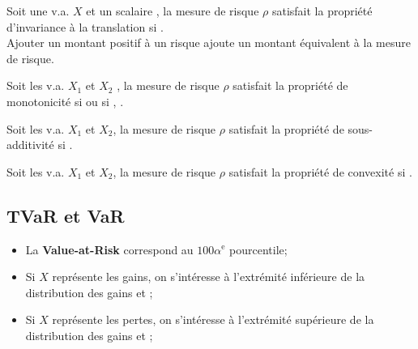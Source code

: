 \documentclass[10pt, french]{article}
\begin{document}
\begin{multicols*}{2}
\begin{definitionNOHFILLsub}
Soit une v.a. $X$ et un scalaire , la mesure de risque $\rho$ satisfait la propriété d'invariance à la translation si .	\\

Ajouter un montant positif à un risque ajoute un montant équivalent à la mesure de risque.
\end{definitionNOHFILLsub}

\begin{definitionNOHFILLsub}[Monotonicité]
Soit les v.a. $X_{1}$ et $X_{2}$ , la mesure de risque $\rho$ satisfait la propriété de monotonicité si  ou si , .

\end{definitionNOHFILLsub}

\begin{definitionNOHFILLsub}
Soit les v.a. $X_{1}$ et $X_{2}$, la mesure de risque $\rho$ satisfait la propriété de sous-additivité si .

\end{definitionNOHFILLsub}

\begin{definitionNOHFILLsub}[Convexité]
Soit les v.a. $X_{1}$ et $X_{2}$, la mesure de risque $\rho$ satisfait la propriété de convexité si .

\end{definitionNOHFILLsub}

\subsection{TVaR et VaR}

\begin{itemize}
	\item	La \textbf{Value-at-Risk} correspond au $100\alpha^{\text{e}}$ pourcentile;
	\item	Si $X$ représente les gains, on s'intéresse à l'extrémité inférieure de la distribution des gains et ;
	\item	Si $X$ représente les pertes, on s'intéresse à l'extrémité supérieure de la distribution des gains et ;
\end{itemize}


\end{multicols*}
\end{document}
